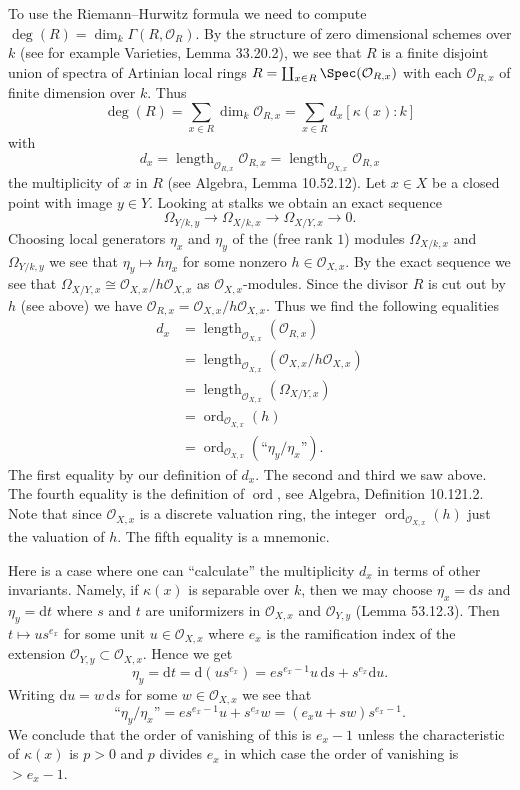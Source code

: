 To use the Riemann--Hurwitz formula we need to compute $\deg(R)=\dim_k\Gamma(R,\mathcal O_R)$. By the structure of zero dimensional schemes over $k$ (see for example Varieties, Lemma 33.20.2), we see that $R$ is a finite disjoint union of spectra of Artinian local rings $R=\coprod_{x\in R}\Spec(\mathcal O_{R,x})$ with each $\mathcal O_{R,x}$ of finite dimension over $k$. Thus
\[\deg(R)=\sum_{x\in R}\dim_k\mathcal O_{R,x}=\sum_{x\in R}d_x[\kappa(x):k]\]
with
\[d_x=\operatorname{length}_{\mathcal O_{R,x}}\mathcal O_{R,x}=\operatorname{length}_{\mathcal O_{X,x}}\mathcal O_{R,x}\]
the multiplicity of $x$ in $R$ (see Algebra, Lemma 10.52.12). Let $x\in X$ be a closed point with image $y\in Y$. Looking at stalks we obtain an exact sequence
\[\Omega_{Y/k,y}\to\Omega_{X/k,x}\to\Omega_{X/Y,x}\to0.\]
Choosing local generators $\eta_x$ and $\eta_y$ of the (free rank $1$) modules $\Omega_{X/k,x}$ and $\Omega_{Y/k,y}$ we see that $\eta_y\mapsto h\eta_x$ for some nonzero $h\in\mathcal O_{X,x}$. By the exact sequence we see that $\Omega_{X/Y,x}\cong\mathcal O_{X,x}/h\mathcal O_{X,x}$ as $\mathcal O_{X,x}$-modules. Since the divisor $R$ is cut out by $h$ (see above) we have $\mathcal O_{R,x}=\mathcal O_{X,x}/h\mathcal O_{X,x}$. Thus we find the following equalities
\begin{align*}
d_x&=\operatorname{length}_{\mathcal O_{X,x}}(\mathcal O_{R,x})\\
&=\operatorname{length}_{\mathcal O_{X,x}}(\mathcal O_{X,x}/h\mathcal O_{X,x})\\
&=\operatorname{length}_{\mathcal O_{X,x}}(\Omega_{X/Y,x})\\
&=\operatorname{ord}_{\mathcal O_{X,x}}(h)\\
&=\operatorname{ord}_{\mathcal O_{X,x}}(\text{``}\eta_y/\eta_x\text{''}).
\end{align*}
The first equality by our definition of $d_x$. The second and third we saw above. The fourth equality is the definition of $\operatorname{ord}$, see Algebra, Definition 10.121.2. Note that since $\mathcal O_{X,x}$ is a discrete valuation ring, the integer $\operatorname{ord}_{\mathcal O_{X,x}}(h)$ just the valuation of $h$. The fifth equality is a mnemonic.

Here is a case where one can ``calculate'' the multiplicity $d_x$ in terms of other invariants. Namely, if $\kappa(x)$ is separable over $k$, then we may choose $\eta_x=\mathrm ds$ and $\eta_y=\mathrm dt$ where $s$ and $t$ are uniformizers in $\mathcal O_{X,x}$ and $\mathcal O_{Y,y}$ (Lemma 53.12.3). Then $t\mapsto us^{e_x}$ for some unit $u\in\mathcal O_{X,x}$ where $e_x$ is the ramification index of the extension $\mathcal O_{Y,y}\subset\mathcal O_{X,x}$. Hence we get
\[\eta_y=\mathrm dt=\mathrm d(us^{e_x})=es^{e_x-1}u\,\mathrm ds+s^{e_x}\mathrm du.\]
Writing $\mathrm du=w\,\mathrm ds$ for some $w\in\mathcal O_{X,x}$ we see that
\[\text{``}\eta_y/\eta_x\text{''}=es^{e_x-1}u+s^{e_x}w=(e_xu+sw)s^{e_x-1}.\]
We conclude that the order of vanishing of this is $e_x-1$ unless the characteristic of $\kappa(x)$ is $p>0$ and $p$ divides $e_x$ in which case the order of vanishing is $>e_x-1$.

